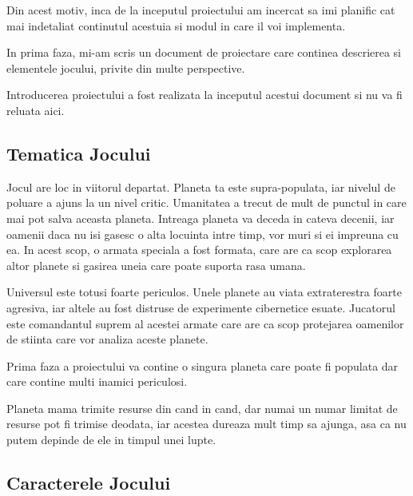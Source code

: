 \documentclass[12pt, a4paper]{article}
\begin{document}
	Din acest motiv, inca de la inceputul proiectului am incercat sa imi planific cat mai indetaliat continutul acestuia si modul in care il voi implementa.
	\newline
	
	In prima faza, mi-am scris un document de proiectare care continea descrierea si elementele jocului, privite din multe perspective.
	\newline
	
	Introducerea proiectului a fost realizata la inceputul acestui document si nu va fi reluata aici.
	
	
	
	
	
	\subsection{Tematica Jocului}
	
	Jocul are loc in viitorul departat. Planeta ta este supra-populata, iar nivelul de poluare a ajuns la un nivel critic. Umanitatea a trecut de mult de punctul in care mai pot salva aceasta planeta. Intreaga planeta va deceda in cateva decenii, iar oamenii daca nu isi gasesc o alta locuinta intre timp, vor muri si ei impreuna cu ea. In acest scop, o armata speciala a fost formata, care are ca scop explorarea altor planete si gasirea uneia care poate suporta rasa umana.
	\newline
	
	Universul este totusi foarte periculos. Unele planete au viata extraterestra foarte agresiva, iar altele au fost distruse de experimente cibernetice esuate. Jucatorul este comandantul suprem al acestei armate care are ca scop protejarea oamenilor de stiinta care vor analiza aceste planete.
	\newline
	
	Prima faza a proiectului va contine o singura planeta care poate fi populata dar care contine multi inamici periculosi.
	\newline
	
	Planeta mama trimite resurse din cand in cand, dar numai un numar limitat de resurse pot fi trimise deodata, iar acestea dureaza mult timp sa ajunga, asa ca nu putem depinde de ele in timpul unei lupte.
	
	
	
	
	
	\subsection{Caracterele Jocului}
	
\end{document}

